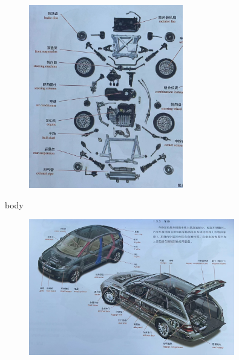 \begin{frame}
	\begin{block}{}
		\begin{figure}[htbp]
			\centering
			\includegraphics[width=0.6\textwidth]{1-10}
		\end{figure}
	\end{block}
\end{frame}
\begin{frame}
	\begin{block}{body}
		\begin{figure}[htbp]
			\centering
			\includegraphics[width=0.8\textwidth]{1-11}
		\end{figure}
	\end{block}
\end{frame}
